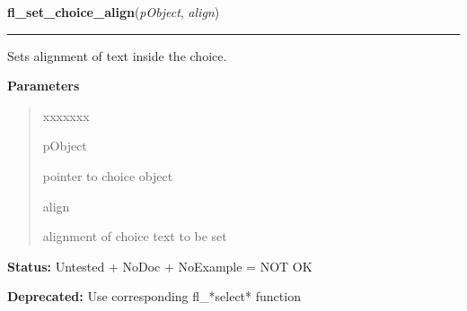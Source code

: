 \hspace{.8\funcindent}\begin{boxedminipage}{\funcwidth}

    \raggedright \textbf{fl\_set\_choice\_align}(\textit{pObject}, \textit{align})

    \vspace{-1.5ex}

    \rule{\textwidth}{0.5\fboxrule}
\setlength{\parskip}{2ex}
    Sets alignment of text inside the choice.

\setlength{\parskip}{1ex}
      \textbf{Parameters}
      \vspace{-1ex}

      \begin{quote}
        \begin{Ventry}{xxxxxxx}

          \item[pObject]

          pointer to choice object

          \item[align]

          alignment of choice text to be set

        \end{Ventry}

      \end{quote}

\textbf{Status:} Untested + NoDoc + NoExample = NOT OK



\textbf{Deprecated:} Use corresponding fl\_*select* function



    \end{boxedminipage}

    \label{xformslib:deprecated:fl_get_choice_item_mode}

    \vspace{0.5ex}

